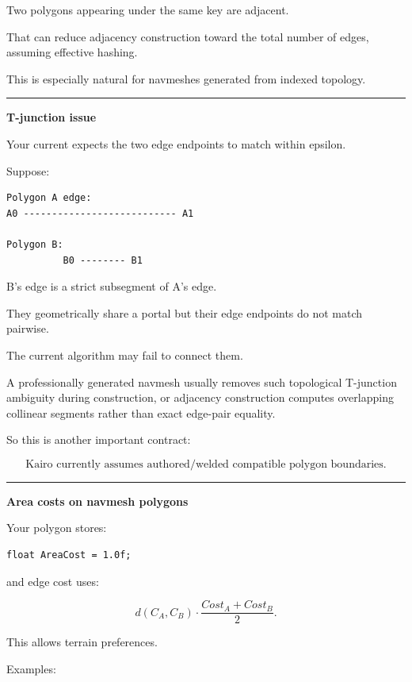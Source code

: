 Two polygons appearing under the same key are adjacent.

That can reduce adjacency construction toward the total number of edges, assuming effective hashing.

This is especially natural for navmeshes generated from indexed topology.

\begin{center}\rule{0.5\linewidth}{0.5pt}\end{center}

\textbf{T-junction issue}

Your current  expects the two edge endpoints to match within epsilon.

Suppose:

\begin{verbatim}
Polygon A edge:
A0 --------------------------- A1

Polygon B:
          B0 -------- B1
\end{verbatim}

B's edge is a strict subsegment of A's edge.

They geometrically share a portal but their edge endpoints do not match pairwise.

The current algorithm may fail to connect them.

A professionally generated navmesh usually removes such topological T-junction ambiguity during construction, or adjacency construction computes overlapping collinear segments rather than exact edge-pair equality.

So this is another important contract:

\[
\boxed{
\text{Kairo currently assumes authored/welded compatible polygon boundaries}.
}
\]

\begin{center}\rule{0.5\linewidth}{0.5pt}\end{center}

\textbf{Area costs on navmesh polygons}

Your polygon stores:

\begin{verbatim}
float AreaCost = 1.0f;
\end{verbatim}

and edge cost uses:

\[
d(C_A,C_B)
\cdot
\frac{Cost_A+Cost_B}{2}.
\]

This allows terrain preferences.

Examples:

